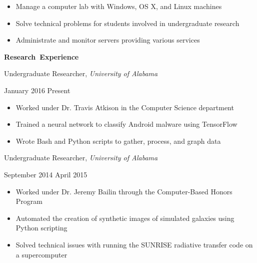 \documentclass[11pt]{article}
\begin{document}
\begin{itemize}
  \item Manage a computer lab with Windows, OS X, and Linux machines
  \item Solve technical problems for students involved in undergraduate research
  \item Administrate and monitor servers providing various services
\end{itemize}

\vspace{0.8em}
\hbox{\large \textbf{Research Experience}}

\vspace{0.4em}
\begin{minipage}[t]{0.65\textwidth}
\flushleft
Undergraduate Researcher, \textit{University of Alabama}\\
\end{minipage}
\begin{minipage}[t]{0.30\textwidth}
\flushright
January 2016 \space \textemdash \space Present\\
\end{minipage}

\begin{itemize}
  \item Worked under Dr. Travis Atkison in the Computer Science department
  \item Trained a neural network to classify Android malware using TensorFlow
  \item Wrote Bash and Python scripts to gather, process, and graph data
\end{itemize}

\vspace{0.4em}
\begin{minipage}[t]{0.65\textwidth}
\flushleft
Undergraduate Researcher, \textit{University of Alabama}\\
\end{minipage}
\begin{minipage}[t]{0.30\textwidth}
\flushright
September 2014 \space \textemdash \space April 2015\\
\end{minipage}

\begin{itemize}
  \item Worked under Dr. Jeremy Bailin through the Computer-Based Honors Program
  \item Automated the creation of synthetic images of simulated galaxies using Python scripting
  \item Solved technical issues with running the SUNRISE radiative transfer code on a supercomputer
\end{itemize}
\end{document}

